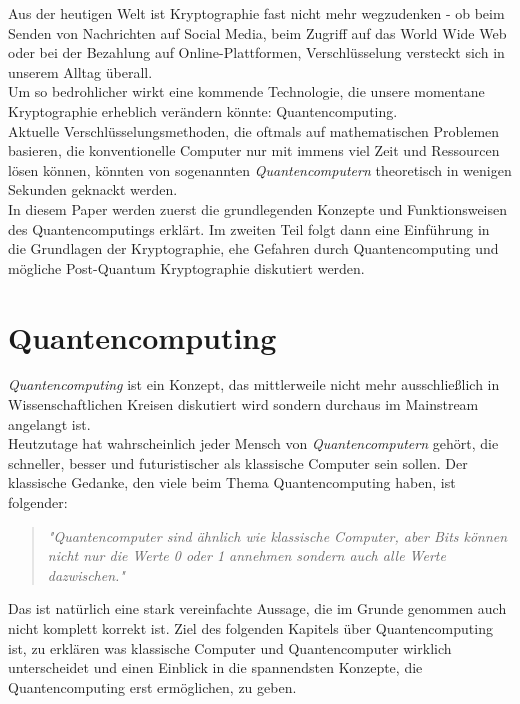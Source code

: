 \documentclass[12pt]{article}
\begin{document}
Aus der heutigen Welt ist Kryptographie fast nicht mehr wegzudenken - ob beim Senden von Nachrichten auf Social Media, beim Zugriff auf das World Wide Web oder bei der Bezahlung auf Online-Plattformen, Verschlüsselung versteckt sich in unserem Alltag überall.\\
Um so bedrohlicher wirkt eine kommende Technologie, die unsere momentane Kryptographie erheblich verändern könnte: Quantencomputing.\\

 Aktuelle Verschlüsselungsmethoden, die oftmals auf mathematischen Problemen basieren, die konventionelle Computer nur mit immens viel Zeit und Ressourcen lösen können, könnten von sogenannten \textit{Quantencomputern} theoretisch in wenigen Sekunden geknackt werden. \\

In diesem Paper werden zuerst die grundlegenden Konzepte und Funktionsweisen des Quantencomputings erklärt. Im zweiten Teil folgt dann eine Einführung in die Grundlagen der Kryptographie, ehe Gefahren durch Quantencomputing und mögliche Post-Quantum Kryptographie diskutiert werden.

\clearpage
\section{Quantencomputing}

\textit{Quantencomputing} ist ein Konzept, das mittlerweile nicht mehr ausschließlich in Wissenschaftlichen Kreisen diskutiert wird sondern durchaus im Mainstream angelangt ist.\\
Heutzutage hat wahrscheinlich jeder Mensch von \textit{Quantencomputern} gehört, die schneller, besser und futuristischer als klassische Computer sein sollen. Der klassische Gedanke, den viele beim Thema Quantencomputing haben, ist folgender:

\begin{quote}
    \textit{"Quantencomputer sind ähnlich wie klassische Computer, aber Bits können nicht nur die Werte 0 oder 1 annehmen sondern auch alle Werte dazwischen."}
\end{quote}

Das ist natürlich eine stark vereinfachte Aussage, die im Grunde genommen auch nicht komplett korrekt ist. Ziel des folgenden Kapitels über Quantencomputing ist, zu erklären was klassische Computer und Quantencomputer wirklich unterscheidet und einen Einblick in die spannendsten Konzepte, die Quantencomputing erst ermöglichen, zu geben.
\end{document}
